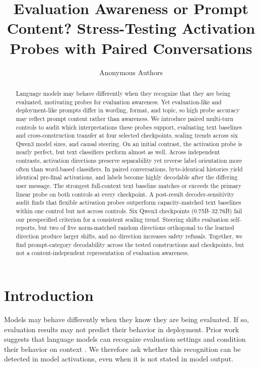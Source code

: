 \documentclass{article}
\title{Evaluation Awareness or Prompt Content? Stress-Testing Activation Probes with Paired Conversations}
\author{Anonymous Authors}
\begin{document}
\maketitle

\begin{abstract}
Language models may behave differently when they recognize that they are being
evaluated, motivating probes for evaluation awareness. Yet evaluation-like and
deployment-like prompts differ in wording, format, and topic, so high
probe accuracy may reflect prompt content rather than awareness. We introduce
paired multi-turn controls to audit which interpretations these probes support,
evaluating text baselines and cross-construction transfer at four selected
checkpoints, scaling trends across six Qwen3 model sizes, and causal steering. On an initial
contrast, the activation probe is nearly perfect, but text classifiers perform
almost as well. Across independent contrasts, activation
directions preserve separability yet reverse label orientation more often than
word-based classifiers. In paired conversations, byte-identical histories yield
identical pre-final activations, and labels become highly decodable after the
differing user message. The strongest full-context text baseline matches or
exceeds the primary linear probe on both controls at every checkpoint. A
post-result decoder-sensitivity audit finds that flexible activation probes
outperform capacity-matched text baselines within one control but not across
controls. Six Qwen3 checkpoints
(0.75B--32.76B) fail our prespecified criterion for a consistent scaling trend.
Steering shifts evaluation self-reports, but two of five norm-matched random
directions orthogonal to the learned direction produce larger shifts, and no
direction increases safety refusals. Together, we find prompt-category
decodability across the tested constructions and checkpoints, but not a
content-independent representation of evaluation awareness.
\end{abstract}

\section{Introduction}

Models may behave differently when they know they are being evaluated. If so,
evaluation results may not predict their behavior in deployment. Prior work
suggests that language models can recognize evaluation settings and condition
their behavior on context
\citep{laine2024sad,needham2025know,greenblatt2024alignment}. We therefore ask
whether this recognition can be detected in model activations, even when it is
not stated in model output.
\end{document}
